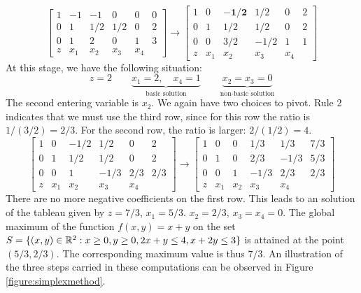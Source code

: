 \begin{example}
\begin{equation*}
\begin{bmatrix}
1 & -1  & -1  & 0   & 0   & 0\\
0 & 1   & 1/2 & 1/2 & 0   & 2 \\
0 & 1   & 2   & 0   & 1   & 3 \\ \hline
z & x_1 & x_2 & x_3 & x_4 
\end{bmatrix} \to 
\begin{bmatrix}
1 & 0   & \boldsymbol{-1/2} & 1/2  & 0   & 2\\
0 & 1   & 1/2               & 1/2  & 0   & 2 \\
0 & 0   & 3/2               & -1/2 & 1   & 1 \\ \hline
z & x_1 & x_2               & x_3 & x_4 
\end{bmatrix}
\end{equation*}
At this stage, we have the following situation:
\begin{equation*}
z = 2 \qquad \underbrace{x_1 = 2, \quad x_4 =1}_{\text{basic solution}} \qquad \underbrace{x_2=x_3=0}_{\text{non-basic solution}}
\end{equation*}
The second entering variable is $x_2$.  We again have two choices to pivot.  Rule 2 indicates that we must use the third row, since for this row the ratio is $1/(3/2)=2/3$.  For the second row, the ratio is larger: $2/(1/2)=4$.
\begin{equation*}
\begin{bmatrix}
1 & 0   & -1/2 & 1/2  & 0   & 2\\
0 & 1   & 1/2  & 1/2  & 0   & 2 \\
0 & 0   & 1    & -1/3 & 2/3 & 2/3 \\ \hline
z & x_1 & x_2  & x_3  & x_4 
\end{bmatrix} \to 
\begin{bmatrix}
1 & 0   & 0   & 1/3  & 1/3  & 7/3 \\
0 & 1   & 0   & 2/3  & -1/3 & 5/3 \\
0 & 0   & 1   & -1/3 & 2/3  & 2/3 \\ \hline
z & x_1 & x_2 & x_3  & x_4 
\end{bmatrix}
\end{equation*}
There are no more negative coefficients on the first row.  This leads to an solution of the tableau given by $z=7/3$, $x_1=5/3$. $x_2=2/3$, $x_3=x_4=0$.  The global maximum of the function $f(x,y)=x+y$ on the set $S = \{ (x,y) \in \mathbb{R}^2: x\geq 0, y \geq 0, 2x+y \leq 4, x+2y \leq 3 \}$ is attained at the point $(5/3, 2/3)$.  The corresponding maximum value is thus $7/3$.  An illustration of the three steps carried in these computations can be observed in Figure \ref{figure:simplexmethod}.

\end{example}
